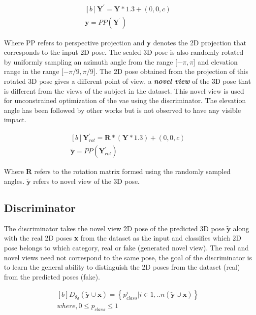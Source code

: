 \begin{equation} \label{eqn:proj_direct}
    \begin{gathered}[b]
        \textbf{Y}^\prime = \textbf{Y}*1.3 + (0,0,c) \\
        \textbf{y} = PP(\textbf{Y}^\prime)
    \end{gathered}
\end{equation}

Where PP refers to perspective projection and \textbf{y} denotes the 2D projection that corresponds to the input 2D pose. The scaled 3D pose is also randomly rotated by uniformly sampling an azimuth angle from the range [$-\pi, \pi$] and elevation range in the range [$-\pi/9, \pi/9$]. The 2D pose obtained from the projection of this rotated 3D pose gives a different point of view, a \textbf{\textit{novel view}} of the 3D pose that is different from the views of the subject in the dataset. This novel view is used for unconstrained optimization of the \ac{vae} using the discriminator. The elevation angle has been followed by other works but is not observed to have any visible impact.

\begin{equation} \label{eqn:proj_rotated}
    \begin{gathered}[b]
        \textbf{Y}^\prime_{rot} = \textbf{R} * (\textbf{Y}*1.3) + (0,0,c) \\
        \tilde{\textbf{y}} = PP(\textbf{Y}^\prime_{rot})
    \end{gathered}
\end{equation}

Where \textbf{R} refers to the rotation matrix formed using the randomly sampled angles. $\tilde{\textbf{y}}$ refers to novel view of the 3D pose.

\subsection{Discriminator}
The discriminator takes the novel view 2D pose of the predicted 3D pose $\tilde{\textbf{y}}$ along with the real 2D poses \textbf{x} from the dataset as the input and classifies which 2D pose belongs to which category, real or fake (generated novel view). The real and novel views need not correspond to the same pose, the goal of the discriminator is to learn the general ability to distinguish the 2D poses from the dataset (real) from the predicted poses (fake).

\begin{equation} \label{eqn:proj_rotated}
    \begin{gathered}[b]
        D_{\theta_d}(\tilde{\textbf{y}} \cup \textbf{x}) = \left\lbrace p_{class}^i | i \in {1, .. n(\tilde{\textbf{y}} \cup \textbf{x})}\right\rbrace \\
        where, 0\leq p_{class} \leq 1
    \end{gathered}
\end{equation}

